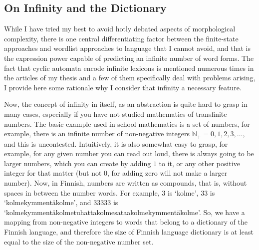 \documentclass[officiallayout,final]{unihelcompling}
\begin{document}
\subsection{On Infinity and the Dictionary}
\label{subsec:infinity}

While I have tried my best to avoid hotly debated aspects of \gls{morphological
complexity}, there is one central differentiating factor between the
finite-state approaches and wordlist approaches to language that I cannot
avoid, and that is the expression power capable of predicting an infinite
number of word forms. The fact that cyclic automata encode infinite lexicons is
mentioned numerous times in the articles of my thesis and a few of them
specifically deal with problems arising, I provide here some rationale why I
consider that infinity a necessary feature.

Now, the concept of infinity in itself, as an abstraction is quite hard to
grasp in many cases, especially if you have not studied mathematics of
transfinite numbers. The basic example used in school mathematics is a set of
numbers, for example, there is an infinite number of non-negative integers
$\mathbb{N}_+ = 0, 1, 2, 3, \ldots$, and this is uncontested. Intuitively, it
is also somewhat easy to grasp, for example, for any given number you can read
out loud, there is always going to be larger numbers, which you can create by
adding $1$ to it, or any other positive integer for that matter (but not $0$,
for adding zero will not make a larger number). Now, in Finnish, numbers are
written as compounds, that is, without spaces in between the number words.  For
example, 3 is `kolme', 33 is `kolmekymmentäkolme', and 33333 is
`kolmekymmentäkolmetuhattakolmesataakolmekymmentäkolme'. So, we have a mapping
from non-negative integers to words that belong to a dictionary of the Finnish
language, and therefore the size of Finnish language dictionary is at least
equal to the size of the non-negative number set.
\end{document}
